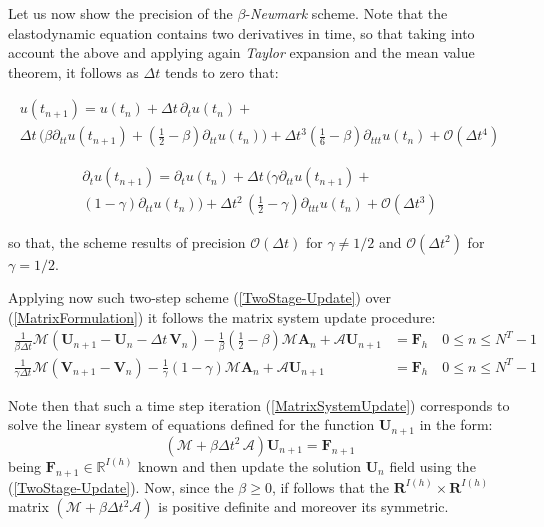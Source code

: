Let us now show the precision of the $\beta$-\textit{Newmark} scheme. Note that the elastodynamic equation contains two derivatives in time, so that taking into account the above and applying again \textit{Taylor} expansion and the mean value theorem, it follows as $\Delta t$ tends to zero that:

\begin{multline}
    u(t_{n+1}) = u(t_{n}) + \Delta t \, \partial_{t} u(t_n) + \\
    \Delta t \, \big( \beta \partial_{tt} u(t_{n+1}) + (\frac{1}{2}- \beta) \partial_{tt} u(t_n) \big) + \Delta t^3 (\frac{1}{6}-\beta) \partial_{ttt}u(t_n) + \mathcal{O}(\Delta t^4)
\end{multline}

\begin{multline}
    \partial_{t} u(t_{n+1}) = \partial_{t} u(t_n) + \Delta t\, \big( \gamma \partial_{tt} u(t_{n+1}) + \\
    (1-\gamma) \partial_{tt}u(t_n) \big) + \Delta t^2 \, (\frac{1}{2}-\gamma) \partial_{ttt} u(t_n) + \mathcal{O}(\Delta t^3)
\end{multline}

so that, the scheme results of precision $\mathcal{O}(\Delta t)$ for $\gamma \neq 1/2$ and $\mathcal{O}(\Delta t^2)$ for $\gamma = 1/2$.

Applying now such two-step scheme (\ref{TwoStage-Update}) over (\ref{MatrixFormulation}) it follows the matrix system update procedure:
\begin{align}
    \label{MatrixSystemUpdate}
    \frac{1}{\beta \Delta t} \mathcal{M}(\mathbf{U}_{n+1} - \mathbf{U}_{n} - \Delta t\, \mathbf{V}_n) - \frac{1}{\beta}(\frac{1}{2}- \beta) \mathcal{M}\mathbf{A}_n + \mathcal{A}\mathbf{U}_{n+1} &= \mathbf{F}_h \quad 0 \leq n \leq N^T-1 \\
    \frac{1}{\gamma \Delta t} \mathcal{M}(\mathbf{V}_{n+1} - \mathbf{V}_{n}) - \frac{1}{\gamma}(1-\gamma) \mathcal{M}\mathbf{A}_n + \mathcal{A}\mathbf{U}_{n+1} & = \mathbf{F}_h \quad 0 \leq n \leq N^T-1
\end{align}

Note then that such a time step iteration (\ref{MatrixSystemUpdate}) corresponds to solve the linear system of equations defined for the function $\mathbf{U}_{n+1}$ in the form:
\begin{equation*}
    (\mathcal{M}+ \beta \Delta t^2 \, \mathcal{A}) \mathbf{U}_{n+1} = \mathbf{F}_{n+1}
\end{equation*}
being $\mathbf{F}_{n+1} \in \mathbb{R}^{I(h)}$ known and then update the solution $\mathbf{U}_n$ field using the (\ref{TwoStage-Update}).
Now, since the $\beta \geq 0$, if follows that the $\mathbf{R}^{I(h)} \times \mathbf{R}^{I(h)}$ matrix $(\mathcal{M}+ \beta \Delta t^2 \mathcal{A})$ is positive definite and moreover its symmetric. 


